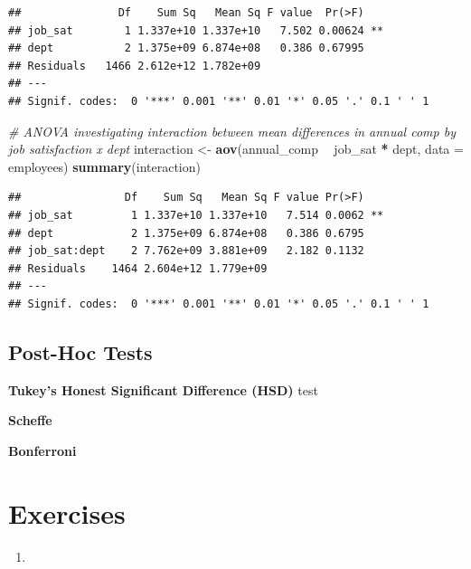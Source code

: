 \documentclass[]{book}
\newenvironment{Shaded}{\begin{snugshade}}{\end{snugshade}}
\newcommand{\CommentTok}[1]{\textcolor[rgb]{0.56,0.35,0.01}{\textit{#1}}}
\newcommand{\DataTypeTok}[1]{\textcolor[rgb]{0.13,0.29,0.53}{#1}}
\newcommand{\KeywordTok}[1]{\textcolor[rgb]{0.13,0.29,0.53}{\textbf{#1}}}
\newcommand{\NormalTok}[1]{#1}
\newcommand{\OperatorTok}[1]{\textcolor[rgb]{0.81,0.36,0.00}{\textbf{#1}}}
\newcommand{\StringTok}[1]{\textcolor[rgb]{0.31,0.60,0.02}{#1}}
\begin{document}
\begin{verbatim}
##               Df    Sum Sq   Mean Sq F value  Pr(>F)   
## job_sat        1 1.337e+10 1.337e+10   7.502 0.00624 **
## dept           2 1.375e+09 6.874e+08   0.386 0.67995   
## Residuals   1466 2.612e+12 1.782e+09                   
## ---
## Signif. codes:  0 '***' 0.001 '**' 0.01 '*' 0.05 '.' 0.1 ' ' 1
\end{verbatim}

\begin{Shaded}
\begin{Highlighting}[]
\CommentTok{# ANOVA investigating interaction between mean differences in annual comp by job satisfaction x dept}
\NormalTok{interaction <-}\StringTok{ }\KeywordTok{aov}\NormalTok{(annual_comp }\OperatorTok{~}\StringTok{ }\NormalTok{job_sat }\OperatorTok{*}\StringTok{ }\NormalTok{dept, }\DataTypeTok{data =}\NormalTok{ employees)}
\KeywordTok{summary}\NormalTok{(interaction)}
\end{Highlighting}
\end{Shaded}

\begin{verbatim}
##                Df    Sum Sq   Mean Sq F value Pr(>F)   
## job_sat         1 1.337e+10 1.337e+10   7.514 0.0062 **
## dept            2 1.375e+09 6.874e+08   0.386 0.6795   
## job_sat:dept    2 7.762e+09 3.881e+09   2.182 0.1132   
## Residuals    1464 2.604e+12 1.779e+09                  
## ---
## Signif. codes:  0 '***' 0.001 '**' 0.01 '*' 0.05 '.' 0.1 ' ' 1
\end{verbatim}

\hypertarget{post-hoc-tests}{%
\subsection{Post-Hoc Tests}\label{post-hoc-tests}}

\textbf{Tukey's Honest Significant Difference (HSD)} test

\textbf{Scheffe}

\textbf{Bonferroni}

\hypertarget{exercises-6}{%
\section{Exercises}\label{exercises-6}}

\begin{enumerate}
\def\labelenumi{\arabic{enumi}.}
\item
\end{enumerate}
\end{document}

